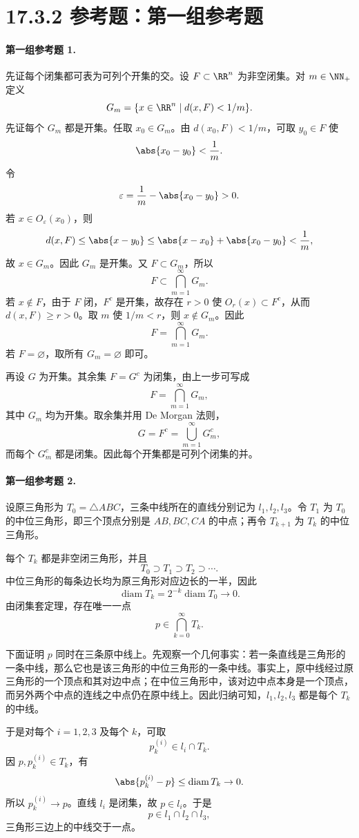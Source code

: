 \section*{17.3.2 参考题：第一组参考题}

\paragraph{第一组参考题 1.}
\begin{xsolution}
先证每个闭集都可表为可列个开集的交。设 $F\subset\RR^n$ 为非空闭集。对 $m\in\NN_+$ 定义
\[
  G_m=\{x\in\RR^n\mid d(x,F)<1/m\}.
\]
先证每个 $G_m$ 都是开集。任取 $x_0\in G_m$。由 $d(x_0,F)<1/m$，可取 $y_0\in F$ 使
\[
  \abs{x_0-y_0}<\frac1m.
\]
令
\[
  \varepsilon=\frac1m-\abs{x_0-y_0}>0.
\]
若 $x\in O_\varepsilon(x_0)$，则
\[
  d(x,F)\leq\abs{x-y_0}
  \leq\abs{x-x_0}+\abs{x_0-y_0}
  <\frac1m,
\]
故 $x\in G_m$。因此 $G_m$ 是开集。又 $F\subset G_m$，所以
\[
  F\subset\bigcap_{m=1}^\infty G_m.
\]
若 $x\notin F$，由于 $F$ 闭，$F^c$ 是开集，故存在 $r>0$ 使 $O_r(x)\subset F^c$，从而 $d(x,F)\geq r>0$。取 $m$ 使 $1/m<r$，则 $x\notin G_m$。因此
\[
  F=\bigcap_{m=1}^\infty G_m.
\]
若 $F=\varnothing$，取所有 $G_m=\varnothing$ 即可。

再设 $G$ 为开集。其余集 $F=G^c$ 为闭集，由上一步可写成
\[
  F=\bigcap_{m=1}^\infty G_m,
\]
其中 $G_m$ 均为开集。取余集并用 De Morgan 法则，
\[
  G=F^c=\bigcup_{m=1}^\infty G_m^c,
\]
而每个 $G_m^c$ 都是闭集。因此每个开集都是可列个闭集的并。
\end{xsolution}

\paragraph{第一组参考题 2.}
\begin{xsolution}
设原三角形为 $T_0=\triangle ABC$，三条中线所在的直线分别记为 $l_1,l_2,l_3$。令 $T_1$ 为 $T_0$ 的中位三角形，即三个顶点分别是 $AB,BC,CA$ 的中点；再令 $T_{k+1}$ 为 $T_k$ 的中位三角形。

每个 $T_k$ 都是非空闭三角形，并且
\[
  T_0\supset T_1\supset T_2\supset\cdots.
\]
中位三角形的每条边长均为原三角形对应边长的一半，因此
\[
  \operatorname{diam}T_k=2^{-k}\operatorname{diam}T_0\to0.
\]
由闭集套定理，存在唯一一点
\[
  p\in\bigcap_{k=0}^\infty T_k.
\]

下面证明 $p$ 同时在三条原中线上。先观察一个几何事实：若一条直线是三角形的一条中线，那么它也是该三角形的中位三角形的一条中线。事实上，原中线经过原三角形的一个顶点和其对边中点；在中位三角形中，该对边中点本身是一个顶点，而另外两个中点的连线之中点仍在原中线上。因此归纳可知，$l_1,l_2,l_3$ 都是每个 $T_k$ 的中线。

于是对每个 $i=1,2,3$ 及每个 $k$，可取
\[
  p_k^{(i)}\in l_i\cap T_k.
\]
因 $p,p_k^{(i)}\in T_k$，有
\[
  \abs{p_k^{(i)}-p}\leq\operatorname{diam}T_k\to0.
\]
所以 $p_k^{(i)}\to p$。直线 $l_i$ 是闭集，故 $p\in l_i$。于是
\[
  p\in l_1\cap l_2\cap l_3,
\]
三角形三边上的中线交于一点。
\end{xsolution}

